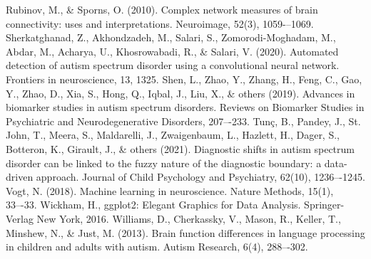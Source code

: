\documentclass[10pt,conference]{IEEEtran}
\begin{document}
\begin{thebibliography}{00}
     {Rubinov, M., \& Sporns, O. (2010). Complex network measures of brain connectivity: uses and interpretations. Neuroimage, 52(3), 1059-–1069.}
     {Sherkatghanad, Z., Akhondzadeh, M., Salari, S., Zomorodi-Moghadam, M., Abdar, M., Acharya, U., Khosrowabadi, R., \& Salari, V. (2020). Automated detection of autism spectrum disorder using a convolutional neural network. Frontiers in neuroscience, 13, 1325.}
     {Shen, L., Zhao, Y., Zhang, H., Feng, C., Gao, Y., Zhao, D., Xia, S., Hong, Q., Iqbal, J., Liu, X., \& others (2019). Advances in biomarker studies in autism spectrum disorders. Reviews on Biomarker Studies in Psychiatric and Neurodegenerative Disorders, 207–-233.}
     {Tunç, B., Pandey, J., St. John, T., Meera, S., Maldarelli, J., Zwaigenbaum, L., Hazlett, H., Dager, S., Botteron, K., Girault, J., \& others (2021). Diagnostic shifts in autism spectrum disorder can be linked to the fuzzy nature of the diagnostic boundary: a data-driven approach. Journal of Child Psychology and Psychiatry, 62(10), 1236–-1245.}
     {Vogt, N. (2018). Machine learning in neuroscience. Nature Methods, 15(1), 33–-33.}    
     {Wickham, H., ggplot2: Elegant Graphics for Data Analysis. Springer-Verlag New York, 2016.}
     {Williams, D., Cherkassky, V., Mason, R., Keller, T., Minshew, N., \& Just, M. (2013). Brain function differences in language processing in children and adults with autism. Autism Research, 6(4), 288–-302.}

\end{thebibliography}
\end{document}
